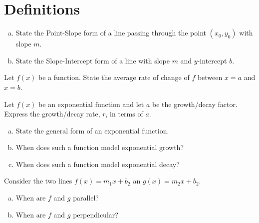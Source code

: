 \documentclass[12pt]{amsart}
\begin{document}
\section{Definitions}

\begin{thm}[4 Points]\label{ex1}
  \begin{enumerate}[(a)]
  \item
    State the Point-Slope form of a line passing through the point $(x_0, y_0)$ with slope $m$.
    \vspace{2in}
  \item
    State the Slope-Intercept form of a line with slope $m$ and $y$-intercept $b$.
    \vspace{2in}
  \end{enumerate}
\end{thm}

\begin{thm}[6 Points]\label{ex2}
  Let $f(x)$ be a function.
  State the average rate of change of $f$ between $x = a$ and $x = b$.
\end{thm}

\newpage

\begin{thm}[5 Points]\label{ex3}
  Let $f(x)$ be an exponential function and let $a$ be the growth/decay factor.
  Express the growth/decay rate, $r$, in terms of $a$.
  \vspace{1in}
\end{thm}

\begin{thm}[3 Points]\label{ex4}
  \begin{enumerate}[(a)]
  \item
    State the general form of an exponential function.
    \vspace{1in}
  \item
    When does such a function model exponential growth?
    \vspace{1in}
  \item
    When does such a function model exponential decay?
    \vspace{1in}
  \end{enumerate}
\end{thm}

\begin{thm}[2 Points]
  Consider the two lines $f(x) = m_1x + b_2$ an $g(x) = m_2x + b_2$.
  \begin{enumerate}[(a)]
  \item
    When are $f$ and $g$ parallel?
    \vspace{1in}
  \item
    When are $f$ and $g$ perpendicular?
    \vspace{1in}
  \end{enumerate}
\end{thm}
\end{document}
